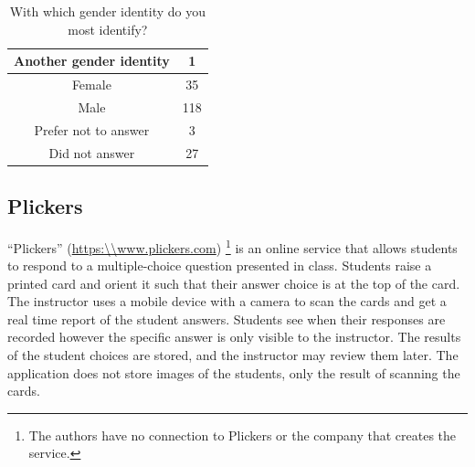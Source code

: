 \documentclass[12pt]{article}
\begin{document}
\begin{table}[ht]
\centering
\caption{With which gender identity do you most identify?}
\begin{tabular}{|c|c|}
\toprule
Another gender identity & 1 \\\midrule
\rowcolor{LightGray}
Female & 35 \\\midrule
Male & 118 \\\midrule
\rowcolor{LightGray}
Prefer not to answer & 3\\\midrule
Did not answer & 27\\ \bottomrule
\end{tabular}
\end{table}

\subsection{Plickers}
``Plickers'' (\url{https:\\www.plickers.com}) \footnote{The authors have no connection to Plickers or the company that creates the service.} is an online service that allows students to respond to a multiple-choice question presented in class. Students raise a printed card and orient it such that their answer choice is at the top of the card. The instructor uses a mobile device with a camera to scan the cards and get a real time report of the student answers. Students see when their responses are recorded however the specific answer is only visible to the instructor. The results of the student choices are stored, and the instructor may review them later. The application does not store images of the students, only the result of scanning the cards. 
\end{document}
